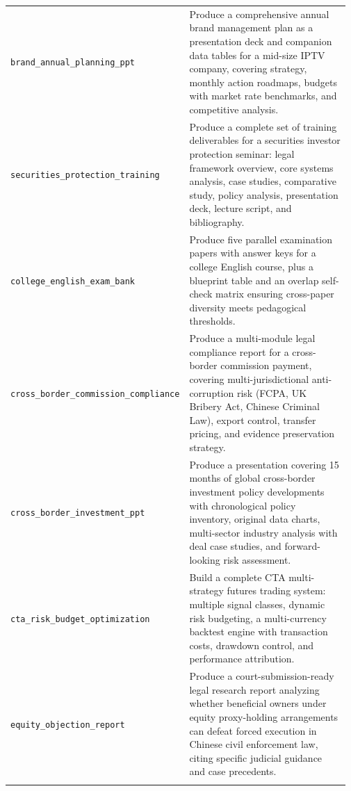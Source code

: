 \begin{longtable}{@{}>{\raggedright\arraybackslash}p{0.20\linewidth}>{\raggedright\arraybackslash}p{0.77\linewidth}@{}}
\tasknoterule
\texttt{brand\_\allowbreak{}annual\_\allowbreak{}planning\_\allowbreak{}ppt} & Produce a comprehensive annual brand management plan as a presentation deck and companion data tables for a mid-size IPTV company, covering strategy, monthly action roadmaps, budgets with market rate benchmarks, and competitive analysis. \\
\tasknoterule
\texttt{securities\_\allowbreak{}protection\_\allowbreak{}training} & Produce a complete set of training deliverables for a securities investor protection seminar: legal framework overview, core systems analysis, case studies, comparative study, policy analysis, presentation deck, lecture script, and bibliography. \\
\tasknoterule
\texttt{college\_\allowbreak{}english\_\allowbreak{}exam\_\allowbreak{}bank} & Produce five parallel examination papers with answer keys for a college English course, plus a blueprint table and an overlap self-check matrix ensuring cross-paper diversity meets pedagogical thresholds. \\
\tasknoterule
\texttt{cross\_\allowbreak{}border\_\allowbreak{}commission\_\allowbreak{}compliance} & Produce a multi-module legal compliance report for a cross-border commission payment, covering multi-jurisdictional anti-corruption risk (FCPA, UK Bribery Act, Chinese Criminal Law), export control, transfer pricing, and evidence preservation strategy. \\
\tasknoterule
\texttt{cross\_\allowbreak{}border\_\allowbreak{}investment\_\allowbreak{}ppt} & Produce a presentation covering 15 months of global cross-border investment policy developments with chronological policy inventory, original data charts, multi-sector industry analysis with deal case studies, and forward-looking risk assessment. \\
\tasknoterule
\texttt{cta\_\allowbreak{}risk\_\allowbreak{}budget\_\allowbreak{}optimization} & Build a complete CTA multi-strategy futures trading system: multiple signal classes, dynamic risk budgeting, a multi-currency backtest engine with transaction costs, drawdown control, and performance attribution. \\
\tasknoterule
\texttt{equity\_\allowbreak{}objection\_\allowbreak{}report} & Produce a court-submission-ready legal research report analyzing whether beneficial owners under equity proxy-holding arrangements can defeat forced execution in Chinese civil enforcement law, citing specific judicial guidance and case precedents. \\
\tasknoterule

\end{longtable}
